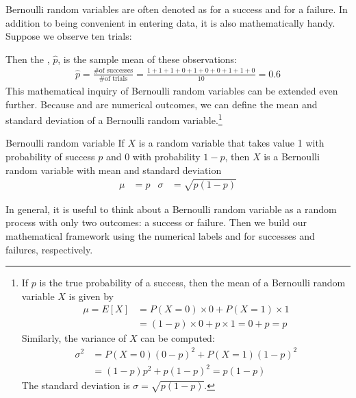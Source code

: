 Bernoulli random variables are often denoted as 
for a success and  for a failure.
In addition to being convenient in entering data,
it is also mathematically handy.
Suppose we observe ten trials:
\begin{center}
         
\end{center}
Then the , $\hat{p}$, is the
sample mean of these observations:
\begin{align*}
\hat{p} = \frac{\text{\# of successes}}{\text{\# of trials}}
    = \frac{1+1+1+0+1+0+0+1+1+0}{10} = 0.6
\end{align*}%
This mathematical inquiry of Bernoulli random variables can
be extended even further.
Because  and  are numerical outcomes,
we can define the {mean} and {standard deviation}
of a Bernoulli random variable.\footnote{If ${p}$ is the true probability of a success, then the mean of a Bernoulli random variable $X$ is given by
\begin{align*}
\mu = E[X] &= P(X = 0) \times 0 + P(X = 1) \times 1 \\
	&= (1 - p) \times 0 + p\times 1 = 0 + p = p
\end{align*}
Similarly, the variance of $X$ can be computed:
\begin{align*}
\sigma^2 &= {P(X=0)(0-p)^2 + P(X=1)(1-p)^2} \\
	&= {(1-p)p^2 + p(1-p)^2} = {p(1-p)}
\end{align*}
The standard deviation is $\sigma=\sqrt{p(1-p)}$.}

\begin{onebox}{Bernoulli random variable}
  If $X$ is a random variable that takes value 1 with
  probability of success $p$ and 0 with probability $1-p$,
  then $X$ is a Bernoulli random variable with mean
  and standard deviation
  \begin{align*}
  \mu &= p
      &\sigma&= \sqrt{p(1-p)}
  \end{align*}
\end{onebox}

In general, it is useful to think about a Bernoulli random variable as a random process with only two outcomes: a success or failure. Then we build our mathematical framework using the numerical labels  and  for successes and failures, respectively.

